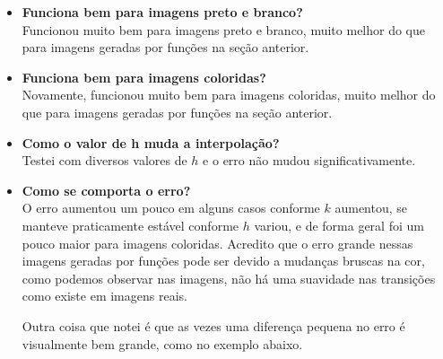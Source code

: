 \documentclass[leqno]{article}
\begin{document}
\begin{itemize}
    \item \textbf{Funciona bem para imagens preto e branco?} \\
        Funcionou muito bem para imagens preto e branco, muito melhor do que
        para imagens geradas por funções na seção anterior.

    \item \textbf{Funciona bem para imagens coloridas?} \\
        Novamente, funcionou muito bem para imagens coloridas, muito melhor do que
        para imagens geradas por funções na seção anterior.

    \item \textbf{Como o valor de h muda a interpolação?} \\
        Testei com diversos valores de $h$ e o erro não mudou significativamente.
    
    \item \textbf{Como se comporta o erro?} \\
        O erro aumentou um pouco em alguns casos conforme $k$ aumentou, se manteve praticamente
        estável conforme $h$ variou, e de forma geral foi um pouco maior para imagens
        coloridas. Acredito que o erro grande nessas imagens geradas por funções
        pode ser devido a mudanças bruscas na cor, como podemos observar nas imagens,
        não há uma suavidade nas transições como existe em imagens reais.

        Outra coisa que notei é que as vezes uma diferença pequena no erro é
        visualmente bem grande, como no exemplo abaixo. 
        

\end{itemize}
\end{document}
